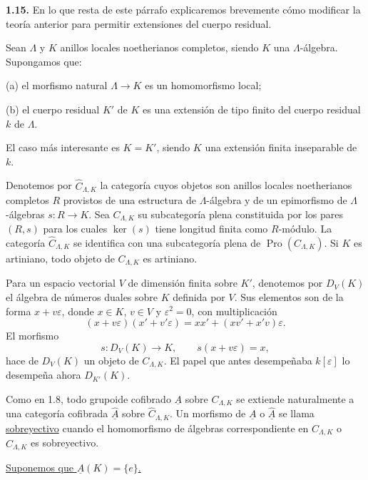 
\textbf{1.15.} En lo que resta de este párrafo explicaremos brevemente
cómo modificar la teoría anterior para permitir extensiones del cuerpo
residual.

Sean $\Lambda$ y $K$ anillos locales noetherianos completos, siendo
$K$ una $\Lambda$-álgebra. Supongamos que:

(a) el morfismo natural $\Lambda\longrightarrow K$ es un
homomorfismo local;

(b) el cuerpo residual $K'$ de $K$ es una extensión de tipo finito del
cuerpo residual $k$ de $\Lambda$.

El caso más interesante es $K=K'$, siendo $K$ una extensión finita
inseparable de $k$.

Denotemos por $\widehat C_{\Lambda,K}$ la categoría cuyos objetos son
anillos locales noetherianos completos $R$ provistos de una estructura
de $\Lambda$-álgebra y de un epimorfismo de $\Lambda$-álgebras
$s:R\longrightarrow K$. Sea $C_{\Lambda,K}$ su subcategoría plena
constituida por los pares $(R,s)$ para los cuales $\ker(s)$ tiene
longitud finita como $R$-módulo. La categoría
$\widehat C_{\Lambda,K}$ se identifica con una subcategoría plena de
$\operatorname{Pro}(C_{\Lambda,K})$. Si $K$ es artiniano, todo objeto
de $C_{\Lambda,K}$ es artiniano.

Para un espacio vectorial $V$ de dimensión finita sobre $K'$, denotemos
por $D_V(K)$ el álgebra de números duales sobre $K$ definida por $V$.
Sus elementos son de la forma $x+v\varepsilon$, donde $x\in K$,
$v\in V$ y $\varepsilon^2=0$, con multiplicación
\[
 (x+v\varepsilon)(x'+v'\varepsilon)
 =xx'+(xv'+x'v)\varepsilon.
\]
El morfismo
\[
 s:D_V(K)\longrightarrow K,
 \qquad s(x+v\varepsilon)=x,
\]
hace de $D_V(K)$ un objeto de $C_{\Lambda,K}$. El papel que antes
desempeñaba $k[\varepsilon]$ lo desempeña ahora $D_{K'}(K)$.

Como en 1.8, todo grupoide cofibrado $\underline A$ sobre
$C_{\Lambda,K}$ se extiende naturalmente a una categoría cofibrada
$\widehat{\underline A}$ sobre $\widehat C_{\Lambda,K}$. Un morfismo
de $\underline A$ o $\widehat{\underline A}$ se llama
\underline{sobreyectivo} cuando el homomorfismo de álgebras
correspondiente en $C_{\Lambda,K}$ o $\widehat C_{\Lambda,K}$ es
sobreyectivo.


\underline{Suponemos que $\underline A(K)=\{e\}$.}

